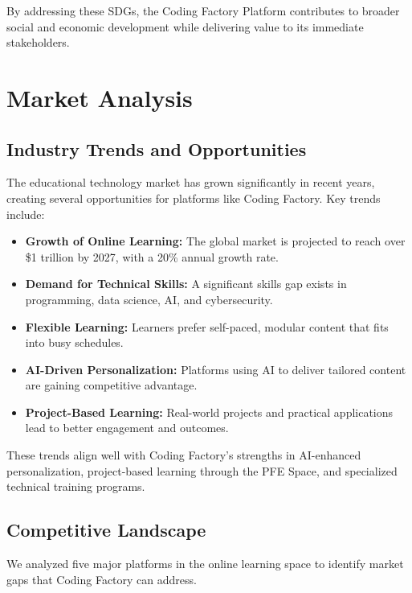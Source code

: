 \documentclass[12pt,a4paper]{report}
\begin{document}
By addressing these SDGs, the Coding Factory Platform contributes to broader social and economic development while delivering value to its immediate stakeholders.

\chapter{Market Analysis}

\section{Industry Trends and Opportunities}
The educational technology market has grown significantly in recent years, creating several opportunities for platforms like Coding Factory. Key trends include:

\begin{itemize}
    \item \textbf{Growth of Online Learning:} The global market is projected to reach over \$1 trillion by 2027, with a 20\% annual growth rate.

    \item \textbf{Demand for Technical Skills:} A significant skills gap exists in programming, data science, AI, and cybersecurity.

    \item \textbf{Flexible Learning:} Learners prefer self-paced, modular content that fits into busy schedules.

    \item \textbf{AI-Driven Personalization:} Platforms using AI to deliver tailored content are gaining competitive advantage.

    \item \textbf{Project-Based Learning:} Real-world projects and practical applications lead to better engagement and outcomes.
\end{itemize}

These trends align well with Coding Factory's strengths in AI-enhanced personalization, project-based learning through the PFE Space, and specialized technical training programs.

\section{Competitive Landscape}
We analyzed five major platforms in the online learning space to identify market gaps that Coding Factory can address.
\end{document}
